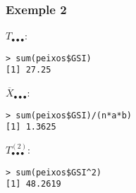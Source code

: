 \documentclass[12pt,t]{beamer}
\theoremstyle{plain}
\theoremstyle{definition}
\begin{document}
\begin{frame}[fragile]
\frametitle{Exemple 2}
\vspace*{-2ex}

$T_{\bullet\bullet\bullet}$:
\vspace*{-1ex}

\begin{verbatim}
> sum(peixos$GSI)
[1] 27.25
\end{verbatim}

$\overline{X}_{\bullet\bullet\bullet}$:
\vspace*{-1ex}

\begin{verbatim}
> sum(peixos$GSI)/(n*a*b)
[1] 1.3625
\end{verbatim}

$T_{\bullet\bullet\bullet}^{(2)}$:
\vspace*{-1ex}

\begin{verbatim}
> sum(peixos$GSI^2)
[1] 48.2619
\end{verbatim}

\end{frame}
\end{document}
